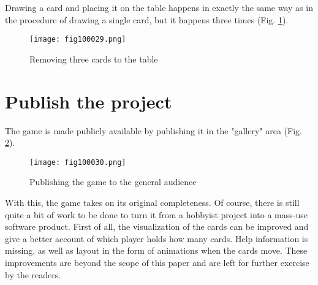 Drawing a card and placing it on the table happens in exactly the same way as in the procedure of drawing a single card, but it happens three times (Fig. \ref{fig100029}).

\begin{figure}[H]
   \centering
   \texttt{[image: fig100029.png]}
   \caption{Removing three cards to the table}
\label{fig100029}
\end{figure}

\section{Publish the project}

The game is made publicly available by publishing it in the "gallery" area (Fig. \ref{fig100030}).

\begin{figure}[H]
   \centering
   \texttt{[image: fig100030.png]}
   \caption{Publishing the game to the general audience}
\label{fig100030}
\end{figure}

With this, the game takes on its original completeness. Of course, there is still quite a bit of work to be done to turn it from a hobbyist project into a mass-use software product. First of all, the visualization of the cards can be improved and give a better account of which player holds how many cards. Help information is missing, as well as layout in the form of animations when the cards move. These improvements are beyond the scope of this paper and are left for further exercise by the readers.
